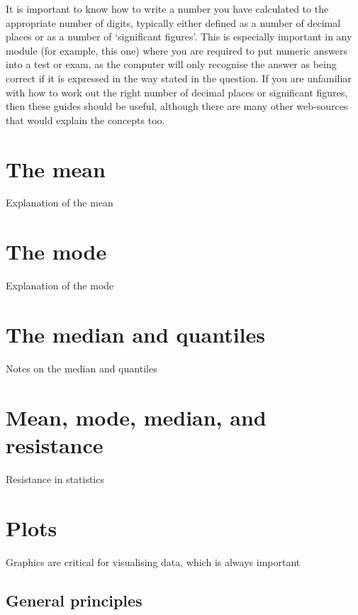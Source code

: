 \documentclass[
]{book}
\begin{document}
It is important to know how to write a number you have calculated to the appropriate number of digits, typically either defined as a number of decimal places or as a number of `significant figures'. This is especially important in any module (for example, this one) where you are required to put numeric answers into a test or exam, as the computer will only recognise the answer as being correct if it is expressed in the way stated in the question. If you are unfamiliar with how to work out the right number of decimal places or significant figures, then these guides should be useful, although there are many other web-sources that would explain the concepts too.

\hypertarget{the-mean}{%
\chapter{The mean}\label{the-mean}}

Explanation of the mean

\hypertarget{the-mode}{%
\chapter{The mode}\label{the-mode}}

Explanation of the mode

\hypertarget{the-median-and-quantiles}{%
\chapter{The median and quantiles}\label{the-median-and-quantiles}}

Notes on the median and quantiles

\hypertarget{mean-mode-median-and-resistance}{%
\chapter{Mean, mode, median, and resistance}\label{mean-mode-median-and-resistance}}

Resistance in statistics

\hypertarget{plots}{%
\chapter{Plots}\label{plots}}

Graphics are critical for visualising data, which is always important

\hypertarget{general-principles}{%
\section{General principles}\label{general-principles}}
\end{document}
